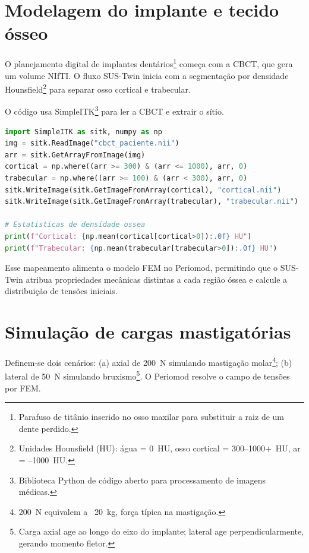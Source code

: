 \label{ch:implantodontia}

\section{Modelagem do implante e tecido ósseo}
O planejamento digital de implantes dentários\footnote{Parafuso de titânio
inserido no osso maxilar para substituir a raiz de um dente perdido.} começa
com a CBCT, que gera um volume NIfTI. O fluxo SUS-Twin inicia com a
segmentação por densidade Hounsfield\footnote{Unidades Hounsfield (HU): água =
0~HU, osso cortical = 300--1000+~HU, ar = --1000~HU.} para separar osso
cortical e trabecular.

O código usa SimpleITK\footnote{Biblioteca Python de código aberto para
processamento de imagens médicas.} para ler a CBCT e extrair o sítio.

\begin{lstlisting}[language=Python,caption={Segmentação óssea com SimpleITK}]
import SimpleITK as sitk, numpy as np
img = sitk.ReadImage("cbct_paciente.nii")
arr = sitk.GetArrayFromImage(img)
cortical = np.where((arr >= 300) & (arr <= 1000), arr, 0)
trabecular = np.where((arr >= 100) & (arr < 300), arr, 0)
sitk.WriteImage(sitk.GetImageFromArray(cortical), "cortical.nii")
sitk.WriteImage(sitk.GetImageFromArray(trabecular), "trabecular.nii")

# Estatisticas de densidade ossea
print(f"Cortical: {np.mean(cortical[cortical>0]):.0f} HU")
print(f"Trabecular: {np.mean(trabecular[trabecular>0]):.0f} HU")
\end{lstlisting}

Esse mapeamento alimenta o modelo FEM no Periomod, permitindo que o SUS-Twin
atribua propriedades mecânicas distintas a cada região óssea e calcule a
distribuição de tensões iniciais.

\section{Simulação de cargas mastigatórias}
Definem-se dois cenários: (a) axial de 200~N simulando mastigação
molar\footnote{200~N equivalem a ~20~kg, força típica na mastigação.}; (b)
lateral de 50~N simulando bruxismo\footnote{Carga axial age ao longo do eixo
do implante; lateral age perpendicularmente, gerando momento fletor.}. O
Periomod resolve o campo de tensões por FEM.

